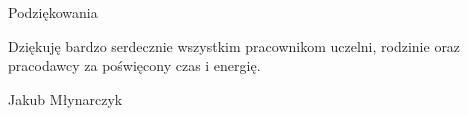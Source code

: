 \noindent
{\Large Podziękowania}
\bigskip

Dziękuję bardzo serdecznie wszystkim pracownikom uczelni, rodzinie oraz pracodawcy za poświęcony czas i energię.

\bigskip

{\raggedleft
Jakub Młynarczyk

}

